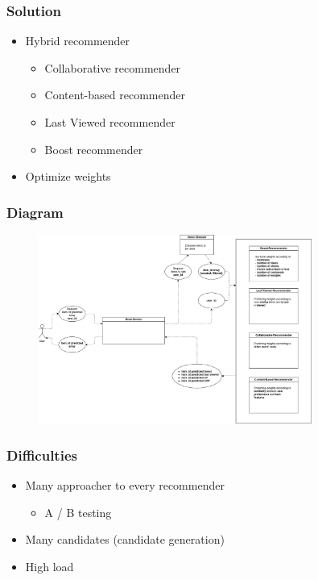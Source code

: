 \documentclass[xetex,mathserif,serif]{beamer}
\begin{document}
\begin{frame}
	\frametitle{Solution}

	\begin{itemize}
		\item Hybrid recommender
		      \begin{itemize}
			      \item Collaborative recommender
			      \item Content-based recommender
			      \item Last Viewed recommender
			      \item Boost recommender
		      \end{itemize}
		\item Optimize weights
	\end{itemize}
\end{frame}


\begin{frame}
	\frametitle{Diagram}

	\begin{figure}[h]
		\includegraphics[width=0.8\textwidth]{./images/main.png}
		\centering
	\end{figure}
\end{frame}



\begin{frame}
	\frametitle{Difficulties}

	\begin{itemize}
		\item Many approacher to every recommender
		      \begin{itemize}
			      \item A / B testing
		      \end{itemize}
		\item Many candidates (candidate generation)
		\item High load
	\end{itemize}
\end{frame}
\end{document}
